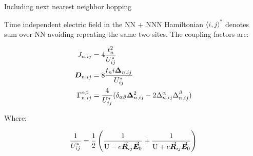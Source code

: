 \begin{section}{Including next nearest neighbor hopping}
\begin{subsection}{Time independent electric field in the NN + NNN Hamiltonian}
$\langle i,j \rangle ^*$ denotes sum over NN avoiding repeating the same two sites. The coupling factors are:

\begin{align}
J_{n,ij} &= 4\frac{t_n^2}{U^*_{ij}} \\
\boldsymbol{D}_{n,ij} &= 8\frac{t_n i\boldsymbol{\Delta}_{n,ij}}{U^*_{ij}} \\
\Gamma_{n,ij}^{\alpha \beta} &= \frac{4}{U^*_{ij}}(\delta_{\alpha \beta} \boldsymbol{\Delta}_{n,ij}^2 - 2\Delta_{n,ij}^\alpha\Delta_{n,ij}^\beta )
\end{align}

Where:

\begin{equation}
\frac{1}{U^*_{ij}} =  \frac{1}{2}\left( \frac{1}{\text{U} - e\boldsymbol{\vec{R}}_{ij}\boldsymbol{\vec{E}}_0} + \frac{1}{\text{U} + e\boldsymbol{\vec{R}}_{ij}\boldsymbol{\vec{E}}_0} \right)
\end{equation}

\end{subsection}

\end{section}